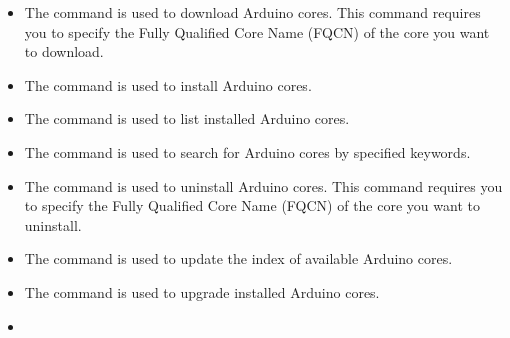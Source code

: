 \begin{itemize}
	\item {}
	
	The command  is used to download Arduino cores. This command requires you to specify the Fully Qualified Core Name (FQCN) of the core you want to download.
	
	
	\item {}
	
	The command  is used to install Arduino cores. 
	
	
	\item {}
	
	The command  is used to list installed Arduino cores.
	
	
	\item {}
	
	The command  is used to search for Arduino cores by specified keywords.
	
	
	\item {}
	
	The command  is used to uninstall Arduino cores. This command requires you to specify the Fully Qualified Core Name (FQCN) of the core you want to uninstall.
	
	
	\item {}
	
	The command  is used to update the index of available Arduino cores.
	
	
	\item {}
	
	The command  is used to upgrade installed Arduino cores.
	
	
	
	\item {}
	

\end{itemize}
